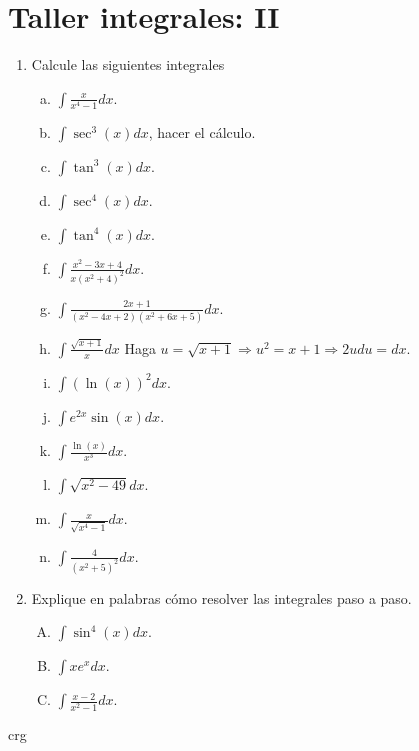 \documentclass[12pt]{amsart}  %
\begin{document}
\section{Taller integrales: II}
\begin{enumerate}
\item Calcule las siguientes integrales
\begin{enumerate}[a):]
\item $\displaystyle{\int \frac{x}{x^{4}-1}dx}$.

\item $\displaystyle{\int \sec^{3}(x)dx}$, hacer el c\'alculo.

\item $\displaystyle{\int \tan^{3}(x)dx}$.

\item $\displaystyle{\int \sec^{4}(x)dx}$.

\item $\displaystyle{\int \tan^{4}(x)dx}$.

\item $\displaystyle{\int \frac{x^2-3x+4}{x(x^{2}+4)^{2}}dx}$.

\item $\displaystyle{\int
\frac{2x+1}{(x^{2}-4x+2)(x^{2}+6x+5)}dx}$.

\item $\displaystyle{\int \frac{\sqrt{x+1}}{x} dx}$ Haga
$u=\sqrt{x+1}\Rightarrow u^2=x+1\Rightarrow 2udu=dx$.

\item $\displaystyle{\int (\ln(x))^{2} dx}$.

\item $\displaystyle{\int  e^{2x}\sin(x)dx}$.

\item $\displaystyle{\int \frac{\ln(x)}{x^{3}}dx}$.

\item $\displaystyle{\int \sqrt{x^{2}-49}dx}$.

\item $\displaystyle{\int \frac{x}{\sqrt{x^{4}-1}} dx}$.

\item $\displaystyle{\int  \frac{4}{(x^{2}+5)^2}dx}$.

\end{enumerate}%
\item Explique en palabras c\'omo resolver las integrales paso a
paso.
\begin{enumerate}[A):]
\item $\displaystyle{\int \sin^{4}(x)dx}$.

\item $\displaystyle{\int xe^{x}dx}$.

\item $\displaystyle{\int \frac{x-2}{x^{2}-1}dx}$.
\end{enumerate}

\end{enumerate} \hfill{crg}
\end{document}
